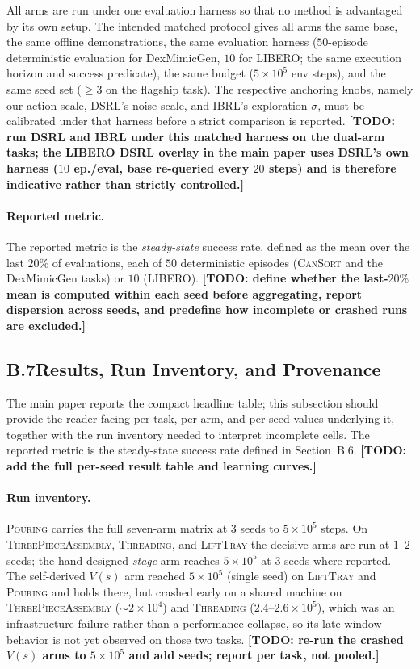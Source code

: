 \documentclass[letterpaper]{article} %
\newcommand{\todo}[1]{\textbf{[TODO: #1]}}
\begin{document}
All arms are run under one evaluation harness so that no method is advantaged by its own
setup. The intended matched protocol gives all arms the same base, the same offline
demonstrations, the same evaluation harness ($50$-episode deterministic evaluation for
DexMimicGen, $10$ for LIBERO; the same execution horizon and success predicate), the same
budget ($5{\times}10^{5}$ env steps), and the same seed set (${\geq}3$ on the flagship
task). The respective anchoring knobs, namely our action scale, DSRL's noise scale, and
IBRL's exploration $\sigma$, must be calibrated under that harness before a strict
comparison is reported. \todo{run DSRL and IBRL under this matched harness on the dual-arm
tasks; the LIBERO DSRL overlay in the main paper uses DSRL's own harness ($10$ ep./eval,
base re-queried every $20$ steps) and is therefore indicative rather than strictly
controlled.}

\paragraph{Reported metric.}
The reported metric is the \emph{steady-state} success rate, defined as the mean over the
last $20\%$ of evaluations, each of $50$ deterministic episodes (\textsc{CanSort} and the
DexMimicGen tasks) or $10$ (LIBERO). \todo{define whether the last-$20\%$ mean is computed
within each seed before aggregating, report dispersion across seeds, and predefine how
incomplete or crashed runs are excluded.}

\subsection{B.7\quad Results, Run Inventory, and Provenance}

The main paper reports the compact headline table; this subsection should provide the
reader-facing per-task, per-arm, and per-seed values underlying it, together with the run
inventory needed to interpret incomplete cells. The reported metric is the steady-state
success rate defined in Section~B.6.
\todo{add the full per-seed result table and learning curves.}

\paragraph{Run inventory.}
\textsc{Pouring} carries the full seven-arm matrix at $3$ seeds to
$5{\times}10^{5}$ steps. On \textsc{ThreePieceAssembly}, \textsc{Threading}, and
\textsc{LiftTray} the decisive arms are run at $1$--$2$ seeds; the hand-designed
\emph{stage} arm reaches $5{\times}10^{5}$ at $3$ seeds where reported. The
self-derived $V(s)$ arm reached $5{\times}10^{5}$ (single seed) on
\textsc{LiftTray} and \textsc{Pouring} and holds there, but crashed early on a shared
machine on \textsc{ThreePieceAssembly} (${\sim}2{\times}10^{4}$) and
\textsc{Threading} ($2.4$--$2.6{\times}10^{5}$), which was an infrastructure failure rather than a
performance collapse, so its late-window behavior is not yet observed on those two
tasks. \todo{re-run the crashed $V(s)$ arms to $5{\times}10^{5}$ and add seeds;
report per task, not pooled.}
\end{document}

